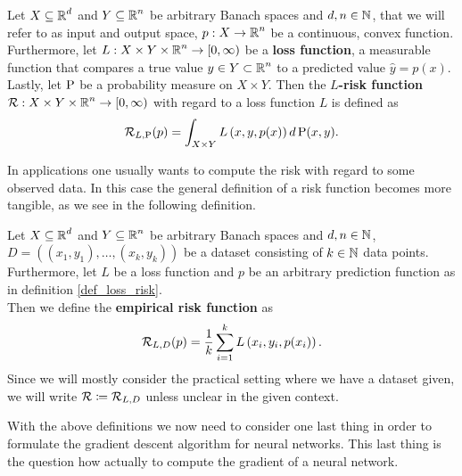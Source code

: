 \begin{definition}\label{def_loss_risk}
Let $X\subseteq \operatorname{\mathbb{R}}^d$ and $Y \subseteq \operatorname{\mathbb{R}}^n$ be arbitrary Banach spaces and $d, n \in \operatorname{\mathbb{N}}$, that we will refer to as input and output space, $p:X \to \operatorname{\mathbb{R}}^n$ be a continuous, convex function.\\
Furthermore, let $L: X \times Y \times \operatorname{\mathbb{R}}^n \to [0, \infty)$ be a \textbf{loss function}, a measurable function that compares a true value $y \in Y \subset \operatorname{\mathbb{R}}^n$ to a predicted value $\hat{y} = p(x)$.\\
Lastly, let $\operatorname{\text{P}}$ be a probability measure on $X \times Y$. Then the \textbf{$L$-risk function} $\operatorname{\mathcal{R}}: X \times Y \times \operatorname{\mathbb{R}}^n \to [0, \infty)$ with regard to a loss function $L$ is defined as
\begin{align*}
\operatorname{\mathcal{R}}_{L, \operatorname{\text{P}}}(p) = \int_{X\times Y} L\left(x, y, p(x) \right) d \operatorname{\text{P}}(x, y).
\end{align*}
\end{definition}


In applications one usually wants to compute the risk with regard to some observed data. In this case the general definition of a risk function becomes more tangible, as we see in the following definition.


\begin{definition}\label{def_empirical_risk}
Let $X\subseteq \operatorname{\mathbb{R}}^d$ and $Y \subseteq \operatorname{\mathbb{R}}^n$ be arbitrary Banach spaces and $d, n \in \operatorname{\mathbb{N}}$, $D = \left((x_1,y_1), \ldots, (x_k,y_k)\right)$ be a dataset consisting of $k\in\operatorname{\mathbb{N}}$ data points. Furthermore, let $L$ be a loss function and $p$ be an arbitrary prediction function as in definition \ref{def_loss_risk}.\\
Then we define the \textbf{empirical risk function} as
\begin{align}
\operatorname{\mathcal{R}}_{L, D} (p) = \frac{1}{k} \sum_{i=1}^{k} L\left(x_i, y_i, p(x_i)\right).
\end{align}
Since we will mostly consider the practical setting where we have a dataset given, we will write $\operatorname{\mathcal{R}} \coloneqq \operatorname{\mathcal{R}}_{L, D}$ unless unclear in the given context.
\end{definition}


With the above definitions we now need to consider one last thing in order to formulate the gradient descent algorithm for neural networks. This last thing is the question how actually to compute the gradient of a neural network.


